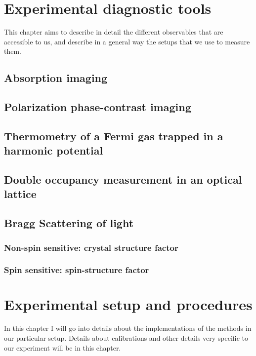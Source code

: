 \documentclass[oneside,11pt]{memoir}
\begin{document}
\chapter{Experimental diagnostic tools} 

This chapter aims to describe in detail the different observables that are
accessible to us, and describe in a general way the setups that we use to
measure them. 

\section{Absorption imaging} 

\section{Polarization phase-contrast imaging} 

\section{Thermometry of a Fermi gas trapped in a harmonic potential} 

\section{Double occupancy measurement in an optical lattice }

\section{Bragg Scattering of light}
 
\subsection{ Non-spin sensitive: crystal structure factor}
\subsection{ Spin sensitive:  spin-structure factor} 

\chapter{Experimental setup and procedures} 

In this chapter I will go into details about the implementations of the methods
in our particular setup.  Details about calibrations and other details very
specific to our experiment will be in this chapter. 
\end{document}
